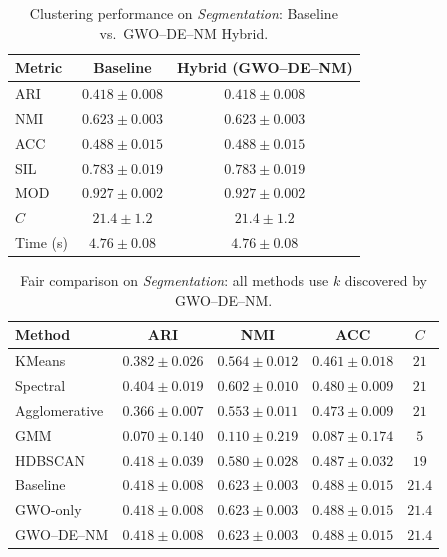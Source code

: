 \begin{table}[htbp]
\centering
\caption{Clustering performance on \textit{Segmentation}: Baseline vs.\ GWO--DE--NM Hybrid.}
\label{tab:segmentation}
\begin{tabular}{lcc}
\toprule
Metric & Baseline & Hybrid (GWO--DE--NM) \\
\midrule
ARI & $0.418 \pm 0.008$ & $\mathbf{0.418 \pm 0.008}$ \\
NMI & $0.623 \pm 0.003$ & $\mathbf{0.623 \pm 0.003}$ \\
ACC & $0.488 \pm 0.015$ & $\mathbf{0.488 \pm 0.015}$ \\
SIL & $0.783 \pm 0.019$ & $\mathbf{0.783 \pm 0.019}$ \\
MOD & $0.927 \pm 0.002$ & $\mathbf{0.927 \pm 0.002}$ \\
\midrule
$C$ & $21.4 \pm 1.2$ & $21.4 \pm 1.2$ \\
Time (s) & $4.76 \pm 0.08$ & $4.76 \pm 0.08$ \\
\bottomrule
\end{tabular}
\end{table}

\begin{table}[htbp]
\centering\small
\caption{Fair comparison on \textit{Segmentation}: all methods use $k$ discovered by GWO--DE--NM.}
\label{tab:fair_segmentation}
\begin{tabular}{lcccc}
\toprule
Method & ARI & NMI & ACC & $C$ \\
\midrule
KMeans & $0.382 \pm 0.026$ & $0.564 \pm 0.012$ & $0.461 \pm 0.018$ & $21$ \\
Spectral & $0.404 \pm 0.019$ & $0.602 \pm 0.010$ & $0.480 \pm 0.009$ & $21$ \\
Agglomerative & $0.366 \pm 0.007$ & $0.553 \pm 0.011$ & $0.473 \pm 0.009$ & $21$ \\
GMM & $0.070 \pm 0.140$ & $0.110 \pm 0.219$ & $0.087 \pm 0.174$ & $5$ \\
HDBSCAN & $\mathbf{0.418 \pm 0.039}$ & $0.580 \pm 0.028$ & $0.487 \pm 0.032$ & $19$ \\
\midrule
Baseline & $0.418 \pm 0.008$ & $0.623 \pm 0.003$ & $0.488 \pm 0.015$ & $21.4$ \\
GWO-only & $0.418 \pm 0.008$ & $0.623 \pm 0.003$ & $0.488 \pm 0.015$ & $21.4$ \\
GWO--DE--NM & $0.418 \pm 0.008$ & $0.623 \pm 0.003$ & $0.488 \pm 0.015$ & $21.4$ \\
\bottomrule
\end{tabular}
\end{table}

